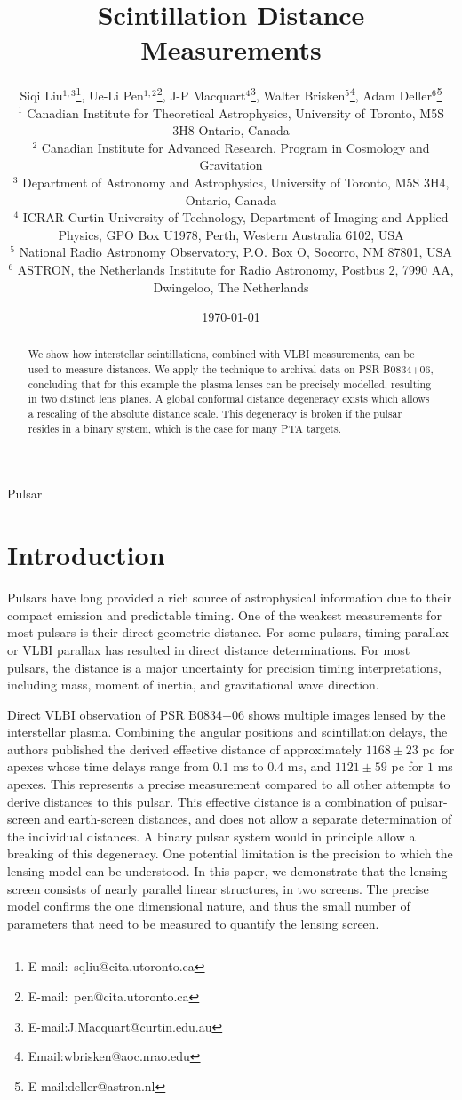 \documentclass[useAMS,usenatbib]{mn2e}
\title[Lensing Distance]{
Scintillation Distance Measurements
}
\author[Liu et al]{Siqi Liu$^{1,3}$\thanks{E-mail:\ sqliu@cita.utoronto.ca}, Ue-Li
  Pen$^{1,2}$\thanks{E-mail:\ pen@cita.utoronto.ca}, J-P Macquart$^{4}$\thanks{E-mail:J.Macquart@curtin.edu.au},
  Walter Brisken$^{5}$\thanks{Email:wbrisken@aoc.nrao.edu}, Adam Deller$^{6}$\thanks{E-mail:deller@astron.nl}\\
 $^1$ Canadian Institute for Theoretical Astrophysics, University of Toronto, M5S 3H8 Ontario, Canada \\
$^2$ Canadian Institute for Advanced Research, Program in Cosmology
and Gravitation\\
$^3$ Department of Astronomy and Astrophysics, University of Toronto, M5S 3H4, Ontario, Canada\\
$^4$ ICRAR-Curtin University of Technology, Department of Imaging and Applied Physics, GPO Box U1978, Perth, Western Australia 6102, USA \\
$^5$ National Radio Astronomy Observatory, P.O. Box O, Socorro, NM 87801, USA\\
$^6$ ASTRON, the Netherlands Institute for Radio Astronomy, Postbus 2, 7990 AA, Dwingeloo, The Netherlands\\
}
\begin{document}
\date{\today}

\pagerange{\pageref{firstpage}--\pageref{lastpage}} 

\maketitle
\label{firstpage}
\begin{abstract}
We show how interstellar scintillations, combined with VLBI
measurements, can be used to measure distances.  
We apply the technique to archival data on PSR
B0834+06, concluding that for this example the plasma lenses can be
precisely modelled, resulting in two distinct lens planes.  A global
conformal distance degeneracy exists which allows a rescaling of the
absolute distance scale.  This degeneracy is broken if the pulsar resides in a
binary system, which is the case for many PTA targets.
\end{abstract}
\begin{keywords}
Pulsar
\end{keywords}

\newcommand{\be}{\begin{eqnarray}}
\newcommand{\ee}{\end{eqnarray}}
\newcommand{\beq}{\begin{equation}}
\newcommand{\eeq}{\end{equation}}

\section{Introduction}

Pulsars have long provided a rich source of astrophysical information
due to their compact emission and predictable timing.   One of the
weakest measurements for most pulsars is their direct geometric
distance.  For some pulsars, timing parallax or VLBI parallax has
resulted in direct distance determinations.  For most pulsars, the
distance is a major uncertainty for precision timing interpretations,
including mass, moment of inertia, and gravitational wave
direction\citep{boyle2012}.

Direct VLBI observation of PSR B0834+06 shows multiple images lensed
by the interstellar plasma.  Combining the angular positions and
scintillation delays, the authors published the derived effective
distance \citep{2010ApJ...708..232B} of approximately $1168\pm 23$ pc
for apexes whose time delays range from $0.1$ ms to $0.4$ ms, and
$1121\pm 59$ pc for $1$ ms apexes.  This represents a precise
measurement compared to all other attempts to derive distances to this
pulsar.  This effective distance is a combination of pulsar-screen and
earth-screen distances, and does not allow a separate determination of
the individual distances.  A binary pulsar system would in principle
allow a breaking of this degeneracy\citep{2014MNRAS.442.3338P}. One
potential limitation is the precision to which the lensing model can
be understood.  In this paper, we demonstrate that the lensing screen
consists of nearly parallel linear structures, in two screens.  The
precise model confirms the one dimensional nature, and thus the small
number of parameters that need to be measured to quantify the lensing screen. 
\end{document}

